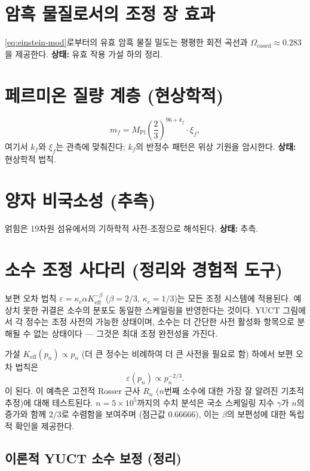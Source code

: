 \documentclass[11pt,a4paper]{article}
\newcommand{\coord}{\mathrm{coord}}
\begin{document}
	\section{암흑 물질로서의 조정 장 효과}
	\label{sec:DM}
	\eqref{eq:einstein-mod}로부터의 유효 암흑 물질 밀도는 평평한 회전 곡선과 \(\Omega_{\coord} \approx 0.283\)을 제공한다. \textbf{상태:} 유효 작용 가설 하의 정리.
	
	\section{페르미온 질량 계층 (현상학적)}
	\label{sec:masses}
	\[
	m_f = M_{\mathrm{Pl}} \left(\frac{2}{3}\right)^{96 + k_f} \cdot \xi_f,
	\]
	여기서 \(k_f\)와 \(\xi_f\)는 관측에 맞춰진다; \(k_f\)의 반정수 패턴은 위상 기원을 암시한다. \textbf{상태:} 현상학적 법칙.
	
	\section{양자 비국소성 (추측)}
	\label{sec:nonlocality}
	얽힘은 19차원 섬유에서의 기하학적 사전-조정으로 해석된다. \textbf{상태:} 추측.
	
	\section{소수 조정 사다리 (정리와 경험적 도구)}
	\label{sec:primes}
	
	보편 오차 법칙 \(\varepsilon = \kappa_c\alpha K_{\mathrm{eff}}^{-\beta}\) (\(\beta=2/3\), \(\kappa_c=1/3\))는 모든 조정 시스템에 적용된다. 예상치 못한 귀결은 소수의 분포도 동일한 스케일링을 반영한다는 것이다. YUCT 그림에서 각 정수는 조정 사전의 가능한 상태이며, 소수는 더 간단한 사전 활성화 항목으로 분해될 수 없는 상태이다 — 그것은 최대 조정 완전성을 가진다.
	
	가설 \(K_{\mathrm{eff}}(p_n) \propto p_n\) (더 큰 정수는 비례하여 더 큰 사전을 필요로 함) 하에서 보편 오차 법칙은
	\[
	\varepsilon(p_n) \propto p_n^{-2/3}.
	\]
	이 된다. 이 예측은 고전적 Rosser 근사 \(R_n\) (\(n\)번째 소수에 대한 가장 잘 알려진 기초적 추정)에 대해 테스트된다. \(n = 5\times10^5\)까지의 수치 분석은 국소 스케일링 지수 \(\gamma\)가 \(n\)의 증가와 함께 \(2/3\)로 수렴함을 보여주며 (점근값 \(0.66666\)), 이는 \(\beta\)의 보편성에 대한 독립적 확인을 제공한다.
	
	\subsection{이론적 YUCT 소수 보정 (정리)}
	
\end{document}
